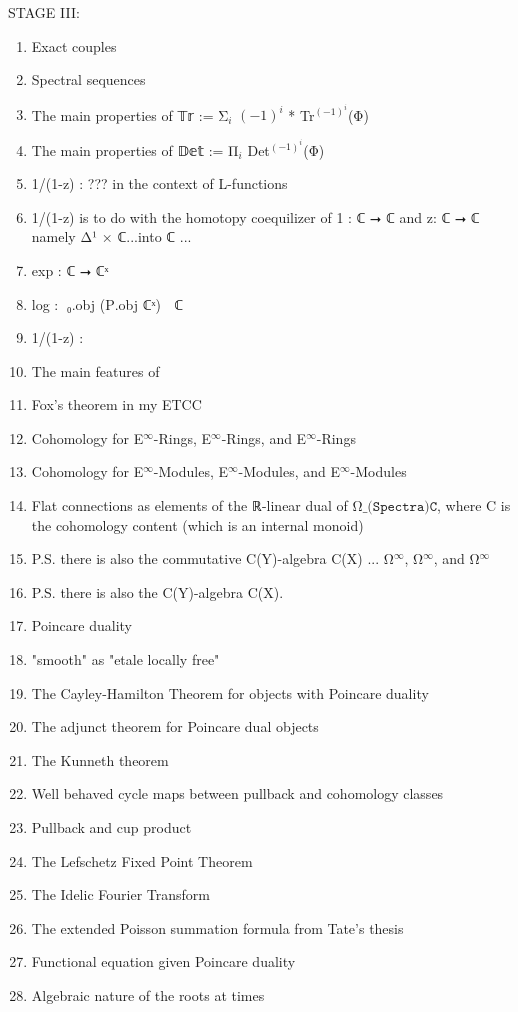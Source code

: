 \documentclass{book}
\begin{document}
STAGE III:
\begin{enumerate}
\item Exact couples
\item Spectral sequences
\item The main properties of 𝕋𝕣 := Σ${}_{i}$ $(-1)^{i}$ * Tr${}^{(-1)^{i}}$(Φ)
\item The main properties of 𝔻𝕖𝕥 := Π${}_i$ Det${}^{(-1)^{i}}$(Φ)
\item 1/(1-z) : ??? in the context of L-functions
\item 1/(1-z) is to do with the homotopy coequilizer of 1 : ℂ ⭢ ℂ and z: ℂ ⭢ ℂ namely Δ¹ × ℂ...into ℂ ... 
\item exp : ℂ ⭢ ℂˣ
\item log : π⃡₀.obj (P⃡.obj ℂˣ) ⭢ ℂ
\item 1/(1-z) : 
\item The main features of 
\item Fox's theorem in my ETCC
\item Cohomology for E${}^{∞}$-Rings, E⃡${}^{∞}$-Rings, and E⃗${}^{∞}$-Rings
\item Cohomology for E${}^{∞}$-Modules, E⃡${}^{∞}$-Modules, and E⃗${}^{∞}$-Modules
\item Flat connections as elements of the ℝ-linear dual of $\texttt{Ω\_(Spectra)C}$, where C is the cohomology content (which is an internal monoid)
\item P.S. there is also the commutative C(Y)-algebra C(X) ... Ω${}^{∞}$, Ω⃡${}^{∞}$, and Ω⃗${}^{∞}$
\item P.S. there is also the C(Y)-algebra C(X).
\item Poincare duality
\item "smooth" as "etale locally free"
\item The Cayley-Hamilton Theorem for objects with Poincare duality
\item The adjunct theorem for Poincare dual objects
\item The Kunneth theorem
\item Well behaved cycle maps between pullback and cohomology classes
\item Pullback and cup product
\item The Lefschetz Fixed Point Theorem
\item The Idelic Fourier Transform
\item The extended Poisson summation formula from Tate's thesis
\item Functional equation given Poincare duality
\item Algebraic nature of the roots at times

\end{enumerate}
\end{document}
